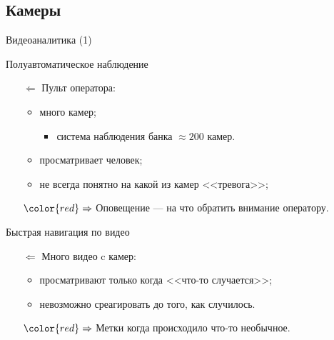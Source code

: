 

\subsection{Камеры}

\begin{frame}{Видеоаналитика (1)}
    \begin{orange-box}{Полуавтоматическое наблюдение}
        \begin{itemize}
            \item[$\Leftarrow$] Пульт оператора:
            \begin{itemize}
                \item много камер;
                \begin{itemize}
                    \item система наблюдения банка 
                    $\approx 200$ камер.
                \end{itemize}
                \item просматривает человек;
                \item не всегда понятно на какой из камер <<тревога>>;
            \end{itemize}
            \item[${\color{red}\Rightarrow}$] Оповещение — на что обратить внимание оператору.
        \end{itemize}
    \end{orange-box}
    \vspace{1.5em}
    \begin{blue-box}{Быстрая навигация по видео}
        \begin{itemize}
            \item[$\Leftarrow$] Много видео c камер:
            \begin{itemize}
                \item просматривают только когда <<что-то случается>>;
                \item невозможно среагировать до того, как случилось.
            \end{itemize}
            \item[${\color{red}\Rightarrow}$] Метки когда 
            происходило что-то необычное.
        \end{itemize}
    \end{blue-box}
\end{frame}

